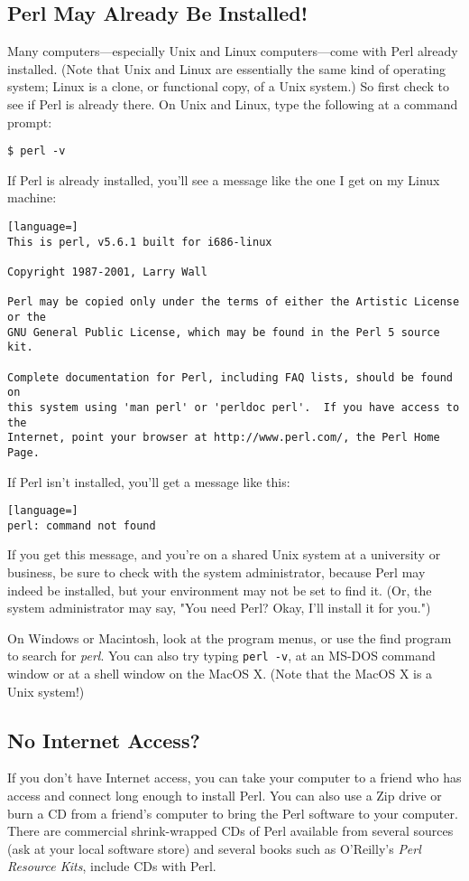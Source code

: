 \subsection{Perl May Already Be Installed!}
Many computers—especially Unix and Linux computers—come with Perl already installed. (Note that Unix and Linux are essentially the same kind of operating system; Linux is a clone, or functional copy, of a Unix system.) So first check to see if Perl is already there. On Unix and Linux, type the following at a command prompt:

\begin{lstlisting}
$ perl -v
\end{lstlisting}

If Perl is already installed, you'll see a message like the one I get on my Linux machine:

\begin{lstlisting}[language=]
This is perl, v5.6.1 built for i686-linux

Copyright 1987-2001, Larry Wall

Perl may be copied only under the terms of either the Artistic License or the
GNU General Public License, which may be found in the Perl 5 source kit.

Complete documentation for Perl, including FAQ lists, should be found on
this system using 'man perl' or 'perldoc perl'.  If you have access to the
Internet, point your browser at http://www.perl.com/, the Perl Home Page.
\end{lstlisting}

If Perl isn't installed, you'll get a message like this:

\begin{lstlisting}[language=]
perl: command not found
\end{lstlisting}

If you get this message, and you're on a shared Unix system at a university or business, be sure to check with the system administrator, because Perl may indeed be installed, but your environment may not be set to find it. (Or, the system administrator may say, "You need Perl? Okay, I'll install it for you.")

On Windows or Macintosh, look at the program menus, or use the find
program to search for \textit{perl}. You can also try typing \verb|perl -v|, at an MS-DOS command window or at a shell window on the MacOS X. (Note that the MacOS X is a Unix system!)

\subsection{No Internet Access?}
If you don't have Internet access, you can take your computer to a friend who has access and connect long enough to install Perl. You can also use a Zip drive or burn a CD from a friend's computer to bring the Perl software to your computer. There are commercial shrink-wrapped CDs of Perl available from several sources (ask at your local software store) and several books such as O'Reilly's \textit{Perl Resource Kits}, include CDs with Perl.

